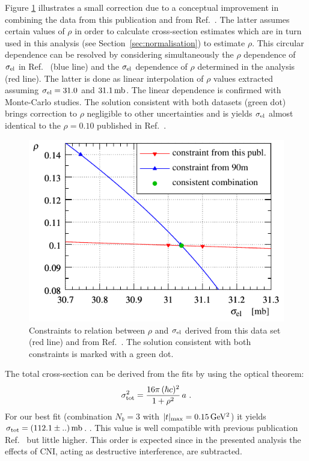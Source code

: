 Figure \ref{fig:si_el rho sol} illustrates a small correction due to a conceptual improvement in combining the data from this publication and from Ref.~\cite{totem-13tev-90m}. The latter assumes certain values of $\rho$ in order to calculate cross-section estimates which are in turn used in this analysis (see Section~\ref{sec:normalisation}) to estimate $\rho$. This circular dependence can be resolved by considering simultaneously the $\rho$ dependence of $\sigma_{\rm el}$ in Ref.~\cite{totem-13tev-90m} (blue line) and the $\sigma_{\rm el}$ dependence of $\rho$ determined in the analysis (red line). The latter is done as linear interpolation of $\rho$ values extracted assuming $\sigma_{\rm el} = 31.0$ and $31.1\,{\rm mb}$. The linear dependence is confirmed with Monte-Carlo studies. The solution consistent with both datasets (green dot) brings correction to $\rho$ negligible to other uncertainties and is yields $\sigma_{\rm el}$ almost identical to the $\rho=0.10$ published in Ref.~\cite{totem-13tev-90m}.


\begin{figure}
\vskip-5mm
\begin{center}
\includegraphics{fig/si_el_rho_solution.pdf}
\caption{%
Constraints to relation between $\rho$ and $\sigma_{\rm el}$ derived from this data set (red line) and from Ref.~\cite{totem-13tev-90m}. The solution consistent with both constraints is marked with a green dot.
}
\label{fig:si_el rho sol}
\end{center}
\end{figure}

The total cross-section can be derived from the fits by using the optical theorem:
\begin{equation}
\label{eq:si tot}
\sigma_{\rm tot}^2 = {16\pi\, (\hbar c)^2\over 1 + \rho^2}\, a\ .
\end{equation}
For our best fit (combination $N_b=3$ with $|t|_{\rm max} = 0.15\,{\rm GeV^2}$) it yields $\sigma_{\rm tot} = (112.1 \pm ..)\,{\rm mb}$. . This value is well compatible with previous publication Ref.~\cite{totem-13tev-90m} but little higher. This order is expected since in the presented analysis the effects of CNI, acting as destructive interference, are subtracted.
